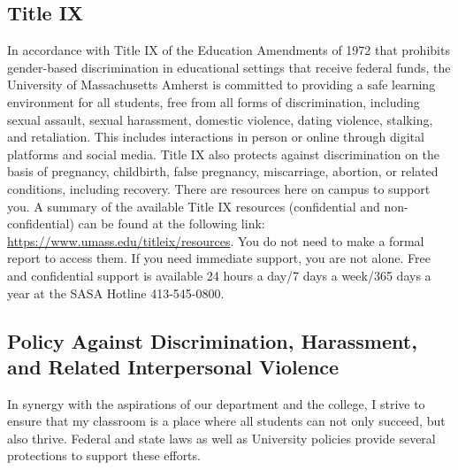 \documentclass[11pt,twoside]{article}
\numberwithin{equation}{section}
\newcommand{\?}{\stackrel{?}{=}}
\begin{document}
\subsection{Title IX}

In accordance with Title IX of the Education Amendments of 1972 that prohibits gender-based discrimination in educational settings that receive federal funds, the University of Massachusetts Amherst is committed to providing a safe learning environment for all students, free from all forms of discrimination, including sexual assault, sexual harassment, domestic violence, dating violence, stalking, and retaliation. This includes interactions in person or online through digital platforms and social media. Title IX also protects against discrimination on the basis of pregnancy, childbirth, false pregnancy, miscarriage, abortion, or related conditions, including recovery. There are resources here on campus to support you. A summary of the available Title IX resources (confidential and non-confidential) can be found at the following link: 
\url{https://www.umass.edu/titleix/resources}. You do not need to make a formal report to access them. If you need immediate support, you are not alone. Free and confidential support is available 24 hours a day/7 days a week/365 days a year at the SASA Hotline 413-545-0800.



\subsection{Policy Against Discrimination, Harassment, and Related Interpersonal Violence}

In synergy with the aspirations of our department and the college, I strive to ensure that my classroom is a place where all students can not only succeed, but also thrive. Federal and state laws as well as University policies provide several protections to support these efforts. 
\end{document}
